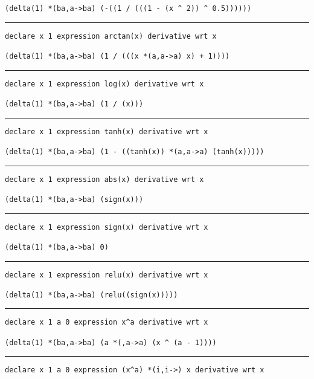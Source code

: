 \documentclass[12pt, a4paper]{report} %
\begin{document}
\begin{multicols}{2}
\begin{verbatim}
(delta(1) *(ba,a->ba) (-((1 / (((1 - (x ^ 2)) ^ 0.5))))))
\end{verbatim}
\vspace{-20pt} \rule[-10pt]{\columnwidth}{0.1pt} 
\begin{verbatim}
declare x 1 expression arctan(x) derivative wrt x

(delta(1) *(ba,a->ba) (1 / (((x *(a,a->a) x) + 1))))
\end{verbatim}
\vspace{-20pt} \rule[-10pt]{\columnwidth}{0.1pt} 
\begin{verbatim}
declare x 1 expression log(x) derivative wrt x

(delta(1) *(ba,a->ba) (1 / (x)))
\end{verbatim}
\vspace{-20pt} \rule[-10pt]{\columnwidth}{0.1pt} 
\begin{verbatim}
declare x 1 expression tanh(x) derivative wrt x

(delta(1) *(ba,a->ba) (1 - ((tanh(x)) *(a,a->a) (tanh(x)))))
\end{verbatim}
\vspace{-20pt} \rule[-10pt]{\columnwidth}{0.1pt} 
\begin{verbatim}
declare x 1 expression abs(x) derivative wrt x

(delta(1) *(ba,a->ba) (sign(x)))
\end{verbatim}
\vspace{-20pt} \rule[-10pt]{\columnwidth}{0.1pt} 
\begin{verbatim}
declare x 1 expression sign(x) derivative wrt x

(delta(1) *(ba,a->ba) 0)
\end{verbatim}
\vspace{-20pt} \rule[-10pt]{\columnwidth}{0.1pt} 
\begin{verbatim}
declare x 1 expression relu(x) derivative wrt x

(delta(1) *(ba,a->ba) (relu((sign(x)))))
\end{verbatim}
\vspace{-20pt} \rule[-10pt]{\columnwidth}{0.1pt} 
\begin{verbatim}
declare x 1 a 0 expression x^a derivative wrt x

(delta(1) *(ba,a->ba) (a *(,a->a) (x ^ (a - 1))))
\end{verbatim}
\vspace{-20pt} \rule[-10pt]{\columnwidth}{0.1pt} 
\begin{verbatim}
declare x 1 a 0 expression (x^a) *(i,i->) x derivative wrt x


\end{verbatim}
\end{multicols}
\end{document}
